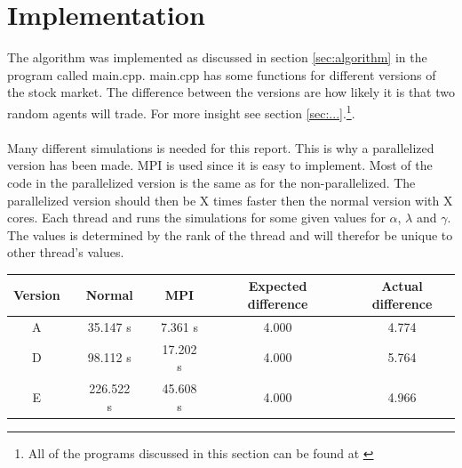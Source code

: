 \pagebreak
\section{Implementation}


The algorithm was implemented as discussed in section \ref{sec:algorithm} in the program called main.cpp. main.cpp has some functions for different versions of the stock market. The difference between the versions are how likely it is that two random agents will trade. For more insight see section \ref{sec:...}.\footnote{All of the programs discussed in this section can be found at \href{https://github.com/erikfsk/Project-5/tree/master/Project5}{\color{blue}{github}}}.
\\
\\
Many different simulations is needed for this report. This is why a parallelized version has been made. MPI is used since it is easy to implement. Most of the code in the parallelized version is the same as for the non-parallelized. The parallelized version should then be X times faster then the normal version with X cores. Each thread and runs the simulations for some given values for $\alpha$, $\lambda$ and $\gamma$. The values is determined by the rank of the thread and will therefor be unique to other thread's values.\footnotemark


\begin{center}
\label{tab:parallell}
\begin{tabularx}{\textwidth}{c X c X c X c X c}
    \hline 
    \hline 
       	Version && Normal && MPI && Expected difference && Actual difference\\ 
    \hline
        A   	&&      35.147  s	&&		7.361 s 	&&	4.000	&&	4.774	\\  
        D   	&&      98.112  s	&&		17.202 s	&&	4.000	&&	5.764	\\
        E   	&&      226.522 s	&&		45.608 s	&&	4.000	&&	4.966	\\
    \hline
\end{tabularx}
\end{center}



